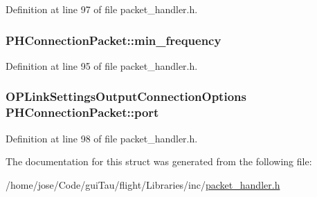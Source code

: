 Definition at line 97 of file packet\-\_\-handler.\-h.

\hypertarget{struct_p_h_connection_packet_a4e11c88e3be1dbcacc324aace217b7e6}{
\subsubsection[{min\-\_\-frequency}]{ P\-H\-Connection\-Packet\-::min\-\_\-frequency}}\label{struct_p_h_connection_packet_a4e11c88e3be1dbcacc324aace217b7e6}


Definition at line 95 of file packet\-\_\-handler.\-h.

\hypertarget{struct_p_h_connection_packet_ae3b874c83f519f62b7ee56a805c527d5}{
\subsubsection[{port}]{\setlength{\rightskip}{0pt plus 5cm}O\-P\-Link\-Settings\-Output\-Connection\-Options P\-H\-Connection\-Packet\-::port}}\label{struct_p_h_connection_packet_ae3b874c83f519f62b7ee56a805c527d5}


Definition at line 98 of file packet\-\_\-handler.\-h.



The documentation for this struct was generated from the following file\-:\begin{DoxyCompactItemize}
\item 
/home/jose/\-Code/gui\-Tau/flight/\-Libraries/inc/\hyperlink{packet__handler_8h}{packet\-\_\-handler.\-h}\end{DoxyCompactItemize}
